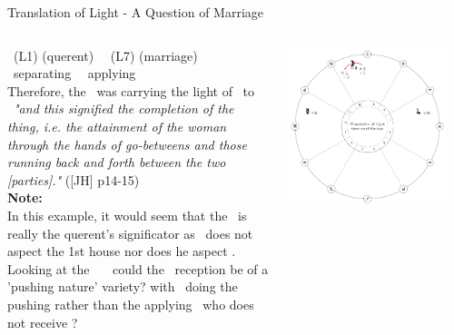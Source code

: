\begin{frame}[t]{Translation of Light  - A Question of Marriage}
\begin{columns}[T, onlytextwidth]
\Mercury\ (L1) (querent) \Quincunx\ \Jupiter\ (L7) (marriage) \\
\Moon\ separating \Sextile\ \Mercury\ applying \Square\ \Jupiter \\
\vspace{0.25cm}
Therefore, the \Moon\ was carrying the light of \Mercury\ to \Jupiter\ \textsl{"and this signified the completion of the thing, i.e. the attainment of the woman through the hands of go-betweens and those running back and forth between the two [parties]."} ([JH] p14-15) \\
\vspace{0.15cm}
\textbf{Note:} \\
\small
In this example, it would seem that the \Moon\ is really the querent's significator as \Mercury\ does not aspect the 1st house nor does he aspect \Jupiter. \\

Looking at the \Moon\ \Sextile\ \Mercury\, could the \Mercury\ reception be of a 'pushing nature' variety? with \Mercury\ doing the pushing rather than the applying \Moon\, who does not receive \Mercury?\footnotemark[1]

\begin{center}
{\includegraphics[width=0.9\textwidth]{charts/60-translation}} \\
\end{center}
\end{columns}
\end{frame}